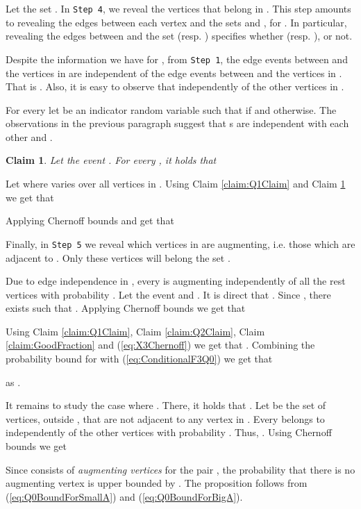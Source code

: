 \documentclass[a4paper,10pt]{article}
\newcommand{\qed}{\hfill\smallskip}
\newtheorem{claim}{Claim}\renewcommand{\theclaim}{\arabic{claim}}
\begin{document}
Let the set .
In {\tt Step 4}, we reveal the vertices that belong in .
This step amounts to revealing the edges between each vertex   
and the sets  and , for .
In particular, revealing the edges between  and the set 
(resp. ) specifies whether 
(resp. ), or not.

Despite the information we have for , from {\tt Step 1}, the edge
events between  and the vertices in  are 
independent of the edge events between  and the vertices in
. That is 
.
Also, it is easy to observe that 
independently of the other vertices in .



For every  let  be an indicator random variable such that
 if  and  otherwise.
The observations in the previous paragraph suggest that s  
are independent with each other and . 



\begin{claim}\label{Lemma:Q3}
Let the event  .
For every , it holds that 
\end{claim}

\noindent
Let  where  varies over all vertices in .  
Using Claim \ref{claim:Q1Claim}  and Claim \ref{Lemma:Q3} we get that

Applying Chernoff bounds and get that 



\noindent
Finally, in {\tt Step 5} we reveal which vertices in 
are augmenting, i.e. those which are adjacent to .
Only these vertices will belong the set .

Due to edge independence in , every 
is augmenting independently of all the rest vertices  with probability 
. 
Let the event  and . It is direct
that .
Since , there exists  
such that . Applying Chernoff bounds we get that

Using Claim \ref{claim:Q1Claim}, Claim \ref{claim:Q2Claim}, Claim \ref{claim:GoodFraction} 
and (\ref{eq:X3Chernoff}) we get that .
Combining the probability bound for  with (\ref{eq:ConditionalF3Q0})
we get that

as .



It remains to study the case where .
There, it holds that . Let  be the 
set of vertices, outside , that are not adjacent to any
vertex in . 
Every   belongs to  independently of the
other vertices with probability .
Thus, . Using Chernoff bounds 
we get

Since  consists of {\em augmenting vertices} for
the pair , the probability that there is no augmenting
vertex is upper bounded by . The proposition
follows from (\ref{eq:Q0BoundForSmallA}) and (\ref{eq:Q0BoundForBigA}).
 \qed \\
\end{document}
